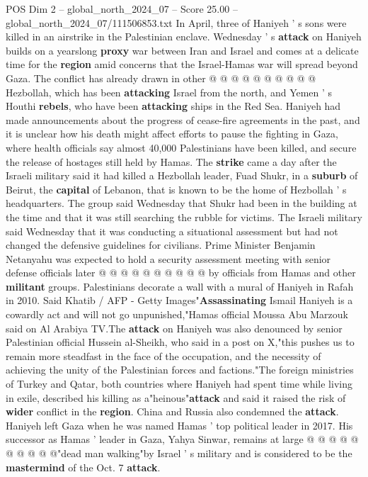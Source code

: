\begin{textsample}{POS Dim 2 – global\_north\_2024\_07 – Score 25.00 – global\_north\_2024\_07/111506853.txt}
In April, three of Haniyeh ' s sons were killed in an airstrike in the Palestinian enclave.
Wednesday ' s \textbf{attack} on Haniyeh builds on a yearslong \textbf{proxy} war between Iran and Israel and comes at a delicate time for the \textbf{region} amid concerns that the Israel-Hamas war will spread beyond Gaza.
The conflict has already drawn in other @ @ @ @ @ @ @ @ @ @ Hezbollah, which has been \textbf{attacking} Israel from the north, and Yemen ' s Houthi \textbf{rebels}, who have been \textbf{attacking} ships in the Red Sea.
Haniyeh had made announcements about the progress of cease-fire agreements in the past, and it is unclear how his death might affect efforts to pause the fighting in Gaza, where health officials say almost 40,000 Palestinians have been killed, and secure the release of hostages still held by Hamas.
The \textbf{strike} came a day after the Israeli military said it had killed a Hezbollah leader, Fuad Shukr, in a \textbf{suburb} of Beirut, the \textbf{capital} of Lebanon, that is known to be the home of Hezbollah ' s headquarters.
The group said Wednesday that Shukr had been in the building at the time and that it was still searching the rubble for victims.
The Israeli military said Wednesday that it was conducting a situational assessment but had not changed the defensive guidelines for civilians.
Prime Minister Benjamin Netanyahu was expected to hold a security assessment meeting with senior defense officials later @ @ @ @ @ @ @ @ @ @ by officials from Hamas and other \textbf{militant} groups.
Palestinians decorate a wall with a mural of Haniyeh in Rafah in 2010.
Said Khatib / AFP - Getty Images"\textbf{Assassinating} Ismail Haniyeh is a cowardly act and will not go unpunished,"Hamas official Moussa Abu Marzouk said on Al Arabiya TV.The \textbf{attack} on Haniyeh was also denounced by senior Palestinian official Hussein al-Sheikh, who said in a post on X,"this pushes us to remain more steadfast in the face of the occupation, and the necessity of achieving the unity of the Palestinian forces and factions."The foreign ministries of Turkey and Qatar, both countries where Haniyeh had spent time while living in exile, described his killing as a"heinous"\textbf{attack} and said it raised the risk of \textbf{wider} conflict in the \textbf{region}.
China and Russia also condemned the \textbf{attack}.
Haniyeh left Gaza when he was named Hamas ' top political leader in 2017.
His successor as Hamas ' leader in Gaza, Yahya Sinwar, remains at large @ @ @ @ @ @ @ @ @ @"dead man walking"by Israel ' s military and is considered to be the \textbf{mastermind} of the Oct. 7 \textbf{attack}.

\end{textsample}
